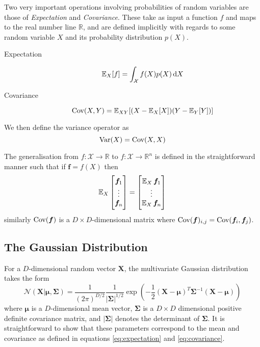 Two very important operations involving probabilities of random variables are
those of \textit{Expectation} and \textit{Covariance}. These take as input a
function $f$ and maps to the real number line $\mathbb{R}$, and are defined
implicitly with regards to some random variable $X$ and its 
probability distribution $p(X)$.
\begin{description}
\item[Expectation]
  \begin{equation}
    \label{eq:expectation}
    \E_X[f] = \int_{\mathcal{X}} f(X) p(X) \dif X
  \end{equation}
\item[Covariance]
  \begin{equation}
    \label{eq:covariance}
    \operatorname{\text{Cov}}(X, Y) = \operatorname{\mathbb{E}}_{XY}[(X - \operatorname{\mathbb{E}}_X[X])(Y - \operatorname{\mathbb{E}}_Y[Y])]
  \end{equation}
\end{description}
We then define the variance operator as
\begin{equation}
  \label{eq:variance}
  \operatorname{\text{Var}}(X) = \operatorname{\text{Cov}}(X, X)
\end{equation}

The generalisation from $f: \mathcal{X} \to \mathbb{R}$ to $f: \mathcal{X} \to
\mathbb{R}^n$ is defined in the straightforward manner such that if $\bm{f} =
f(X)$ then
\begin{equation*}
  \operatorname{\mathbb{E}}_X
  \begin{bmatrix}
    \bm{f}_1 \\
    \vdots \\
    \bm{f}_n \\
  \end{bmatrix} =
  \begin{bmatrix}
    \operatorname{\mathbb{E}}_X \bm{f}_1 \\
    \vdots \\
    \operatorname{\mathbb{E}}_X \bm{f}_n \\
  \end{bmatrix}
\end{equation*}
similarly $\operatorname{\text{Cov}}(\bm{f})$ is a $D \times D$-dimensional matrix where
$\operatorname{\text{Cov}}(\bm{f})_{i,j} = \operatorname{\text{Cov}}(\bm{f}_i, \bm{f}_j)$.\cite{Bishop:2006}

\subsection{The Gaussian Distribution}

For a $D$-dimensional random vector $\bm{X}$, the multivariate Gaussian
distribution takes the form
\begin{equation}
  \label{eq:Gaussian_dist}
  \mathcal{N}(\bm{X} | \bm{\mu}, \bm{\Sigma}) = \frac{1}{(2\pi)^{D/2}}\frac{1}{|\bm{\Sigma}|^{1/2}}\exp\left( -\frac{1}{2}(\bm{X} - \bm{\mu})^T\bm{\Sigma}^{-1}(\bm{X} - \bm{\mu})\right)
\end{equation}
where $\bm{\mu}$ is a $D$-dimensional mean vector, $\bm{\Sigma}$ is a $D \times
D$ dimensional positive definite covariance matrix, and $|\bm{\Sigma}|$ denotes
the determinant of $\bm{\Sigma}$. It is straightforward to show that these
parameters correspond to the mean and covariance as defined in equations
\eqref{eq:expectation} and \eqref{eq:covariance}\cite{}.

